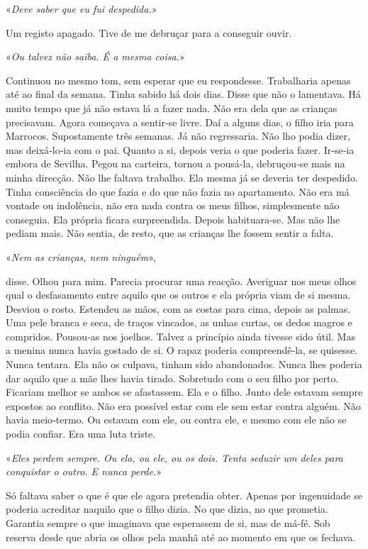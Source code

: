 «\emph{Deve saber que eu fui despedida.}»

Um registo apagado. Tive de me debruçar para a conseguir ouvir.

«\emph{Ou talvez não saiba. É a mesma coisa.}»

Continuou no mesmo tom, sem esperar que eu respondesse. Trabalharia
apenas até ao final da semana. Tinha sabido há dois dias. Disse que não
o lamentava. Há muito tempo que já não estava lá a fazer nada. Não era
dela que as crianças precisavam. Agora começava a sentir­‑se livre. Daí
a alguns dias, o filho iria para Marrocos. Supostamente três semanas. Já
não regressaria. Não lho podia dizer, mas deixá­‑lo­‑ia com o pai.
Quanto a si, depois veria o que poderia fazer. Ir­‑se­‑ia embora de
Sevilha. Pegou na carteira, tornou a pousá­‑la, debruçou­‑se mais na
minha direcção. Não lhe faltava trabalho. Ela mesma já se deveria ter
despedido. Tinha consciência do que fazia e do que não fazia no
apartamento. Não era má vontade ou indolência, não era nada contra os
meus filhos, simplesmente não conseguia. Ela própria ficara
surpreendida. Depois habituara­‑se. Mas não lhe pediam mais. Não sentia,
de resto, que as crianças lhe fossem sentir a falta.

«\emph{Nem as crianças, nem ninguém}»,

disse. Olhou para mim. Parecia procurar uma reacção. Averiguar nos meus
olhos qual o desfasamento entre aquilo que os outros e ela própria viam
de si mesma. Desviou o rosto. Estendeu as mãos, com as costas para cima,
depois as palmas. Uma pele branca e seca, de traços vincados, as unhas
curtas, os dedos magros e compridos. Pousou­‑as nos joelhos. Talvez a
princípio ainda tivesse sido útil. Mas a menina nunca havia gostado de
si. O rapaz poderia compreendê­‑la, se quisesse. Nunca tentara. Ela não
os culpava, tinham sido abandonados. Nunca lhes poderia dar aquilo que a
mãe lhes havia tirado. Sobretudo com o seu filho por perto. Ficariam
melhor se ambos se afastassem. Ela e o filho. Junto dele estavam sempre
expostos ao conflito. Não era possível estar com ele sem estar contra
alguém. Não havia meio­‑termo. Ou estavam com ele, ou contra ele, e
mesmo com ele não se podia confiar. Era uma luta triste.

«\emph{Eles perdem sempre. Ou ela, ou ele, ou os dois. Tenta seduzir um
deles para conquistar o outro. E nunca perde.}»

Só faltava saber o que é que ele agora pretendia obter. Apenas por
ingenuidade se poderia acreditar naquilo que o filho dizia. No que
dizia, no que prometia. Garantia sempre o que imaginava que esperassem
de si, mas de má­‑fé. Sob reserva desde que abria os olhos pela manhã
até ao momento em que os fechava.

